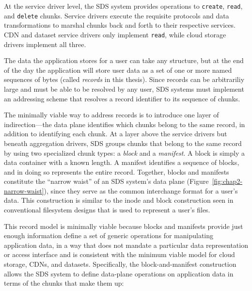 At the service driver level, the SDS
system provides operations to \texttt{create}, \texttt{read}, and
\texttt{delete} chunks.  Service drivers execute the requisite protocols
and data transformations to
marshal chunks back and forth to their respective services.  CDN and dataset
service drivers only implement \texttt{read}, while cloud storage drivers
implement all three.

The data the application stores for a user can take any structure, but at the
end of the day the application will store user data as a set of one or more
named sequences of bytes (called \emph{records} in this thesis).  Since records
can be arbitrariliy large and must be able to be resolved by any user, SDS
systems must implement an addressing scheme that resolves a record identifier to
its sequence of chunks.

The minimally viable way to address records is to introduce one layer of
indirection---the data plane identifies which chunks belong to the same record,
in addition to identifying each chunk.
At a layer above the service drivers but beneath aggregation drivers, SDS
groups chunks that belong to the same record by using two specialized
chunk types:  a \emph{block} and a \emph{manifest}.  A block is simply a data
container with a known length.  A manifest identifies a sequence of blocks, and
in doing so represents the entire record.  Together, blocks and manifests
constitute the ``narrow waist'' of an SDS system's data plane
(Figure~\ref{fig:chap2-narrow-waist}), since they serve as the common
interchange format for a user's data.  This construction is similar to the
inode and block construction seen in conventional filesystem designs that is
used to represent a user's files.

This record model is minimally viable because blocks
and manifests provide just enough information define a
set of generic operations for manipulating application data, in a way that
does not mandate a particular data representation or access interface and is
consistent with the minimum viable model for cloud storage, CDNs, and datasets.
Specifically, the block-and-manifest construction allows
the SDS system to define data-plane operations on
application data in terms of the chunks that make them up:

